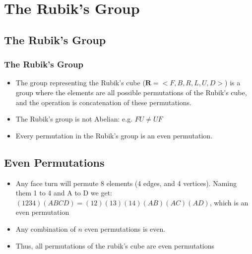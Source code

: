 \documentclass[xcolor=pdftex,dvipsnames,table]{beamer}
\begin{document}
\section{The Rubik's Group}
\subsection{The Rubik's Group}
\begin{frame}
  \frametitle{The Rubik's Group}
  \begin{itemize}
    \item The group representing the Rubik's cube ($ \mathbf{R} = <F, B, R, L, U, D>$) is a group where the elements are all possible permutations of the Rubik's cube, and the operation is concatenation of these permutations.
    \item The Rubik's group is not Abelian: e.g. $FU \neq UF$
    \item Every permutation in the Rubik's group is an even permutation.
  \end{itemize}
\end{frame}

\subsection{Even Permutations}
\begin{frame}
  \begin{itemize}
    \item Any face turn will permute 8 elements (4 edges, and 4 vertices). Naming them 1 to 4 and A to D we get: $(1234)(ABCD) = (12)(13)(14)(AB)(AC)(AD)$, which is an even permutation
    \item Any combination of $n$ even permutations is even.
    \item Thus, all permutations of the rubik's cube are even permutations
  \end{itemize}
\end{frame}
\end{document}

